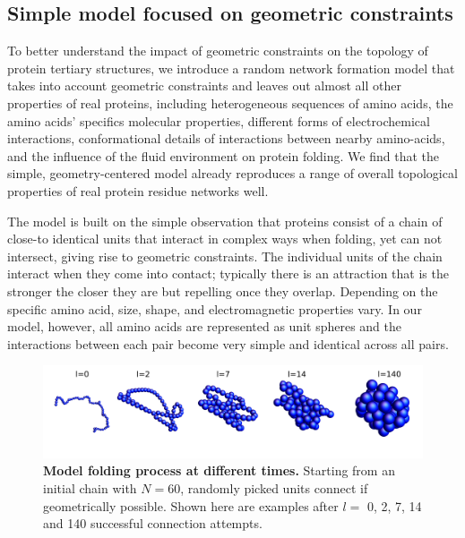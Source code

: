 \documentclass[9pt]{elife}
\begin{document}
\subsection{Simple model focused on geometric constraints}
To better understand the impact of geometric constraints on the topology of protein tertiary structures, we introduce a random network formation model that takes into account geometric constraints and leaves out almost all other properties of real proteins, including heterogeneous sequences of amino acids, the amino acids' specifics molecular properties, different forms of electrochemical interactions, conformational details of interactions between nearby amino-acids, and the influence of the fluid environment on protein folding. We find that the simple, geometry-centered model already reproduces a range of overall topological properties of real protein residue networks well. 

The model is built on the simple observation that proteins consist of a chain of close-to identical units that interact in complex ways when folding, yet can not intersect, giving rise to geometric constraints. The individual units of the chain interact when they come into contact; typically there is an attraction that is the stronger the closer they are but repelling once they overlap. Depending on the specific amino acid, size, shape, and electromagnetic properties vary. In our model, however, all amino acids are represented as unit spheres and the interactions between each pair become very simple and identical across all pairs.

 \begin{figure}[b]
        \centering
	\includegraphics[width=\columnwidth]{progression}
        \caption{\textbf{Model folding process at different times.} Starting from an initial chain with $N=60$, randomly picked units connect if geometrically possible. Shown here are examples after $l=$ 0, 2, 7, 14 and 140 successful connection attempts.} 
        \label{fig.mod}
\end{figure}
\end{document}
